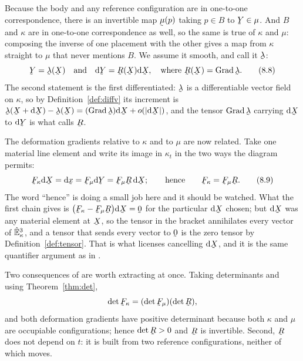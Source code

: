 Because the body and any reference configuration are in one-to-one
correspondence, there is an invertible map $\vek{\mu}(p)$ taking $p\in
B$ to $\bY\in\mu$. And $B$ and $\kappa$ are in one-to-one
correspondence as well, so the same is true of $\kappa$ and $\mu$:
composing the inverse of one placement with the other gives a map from
$\kappa$ straight to $\mu$ that never mentions $B$. We assume it smooth,
and call it $\vek{\lambda}$:
\begin{equation}
   \bY=\vek{\lambda}(\bX)
   \quad\text{and}\quad
   \dl\bY=\bR(\bX)\dl\bX,
   \quad\text{where }\bR(\bX)=\Grad\vek{\lambda}.
   \tag{8.8}\label{eq:8.8}
\end{equation}
The second statement is the first differentiated:
$\vek{\lambda}$ is a differentiable vector field on $\kappa$, so by
Definition~\ref{def:diffv} its increment is
$\vek{\lambda}(\bX+\dl\bX)-\vek{\lambda}(\bX)
=(\Grad\vek{\lambda})\dl\bX+o(|\dl\bX|)$, and the tensor
$\Grad\vek{\lambda}$ carrying $\dl\bX$ to $\dl\bY$ is what 
calls $\bR$.

The deformation gradients relative to $\kappa$ and to $\mu$ are now
related. Take one material line element and write its image in
$\kappa_{t}$ in the two ways the diagram permits:
\begin{equation}
   \bF_{\kappa}\dl\bX=\dl\bx=\bF_{\mu}\dl\bY=\bF_{\mu}\bR\,\dl\bX;
   \qquad\text{hence}\qquad
   \bF_{\kappa}=\bF_{\mu}\bR .
   \tag{8.9}\label{eq:8.9}
\end{equation}
The word ``hence'' is doing a small job here and it should be watched.
What the first chain gives is
$\big(\bF_{\kappa}-\bF_{\mu}\bR\big)\dl\bX=\bze$ for the particular
$\dl\bX$ chosen; but $\dl\bX$ was any material element at $\bX$, so the
tensor in the bracket annihilates every vector of $\hat{\mathbb{E}}^{3}_{\kappa}$, and a
tensor that sends every vector to $\bze$ is the zero tensor by
Definition~\ref{def:tensor}. That is what licenses cancelling $\dl\bX$,
and it is the same quantifier argument as in .

Two consequences of  are worth extracting at once. Taking
determinants and using Theorem~\ref{thm:det},
\[
   \det\bF_{\kappa}=(\det\bF_{\mu})(\det\bR),
\]
and both deformation gradients have positive determinant because both
$\kappa$ and $\mu$ are occupiable configurations; hence $\det\bR>0$ and
$\bR$ is invertible. Second, $\bR$ does not depend on $t$: it is built
from two reference configurations, neither of which moves.

